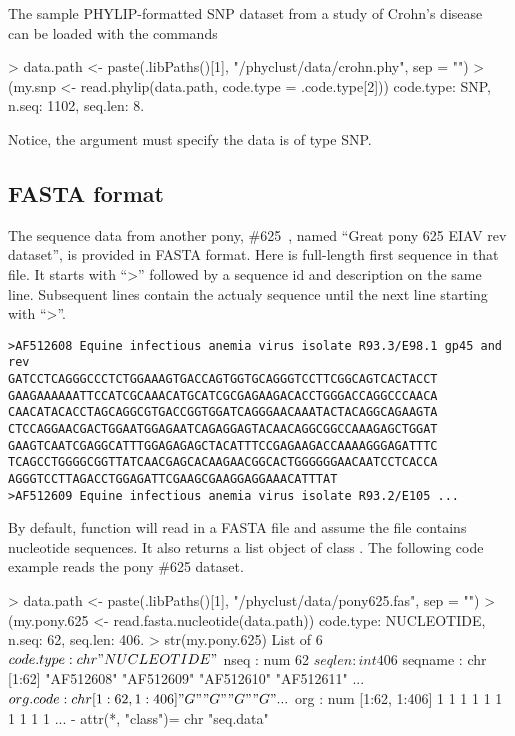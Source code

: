The sample PHYLIP-formatted SNP dataset from a study of Crohn's disease~\citep{Hugot2001} can be loaded with the commands
\begin{Code}
> data.path <- paste(.libPaths()[1], "/phyclust/data/crohn.phy", sep = "")
> (my.snp <- read.phylip(data.path, code.type = .code.type[2]))
code.type: SNP, n.seq: 1102, seq.len: 8.
\end{Code}
Notice, the  argument must specify the data is of type SNP.




\subsection[Input FASTA format]{FASTA format}
\label{sec:fasta}

The sequence data from another pony, \#625~\citep{Baccam2003},
named ``Great pony 625 EIAV rev dataset'',
is provided in FASTA format.
Here is full-length first sequence in that file. It starts with ``>''
followed by a sequence id and description on the same line.
Subsequent lines contain the actualy sequence until the next line starting with ``>''.
\begin{verbatim}
>AF512608 Equine infectious anemia virus isolate R93.3/E98.1 gp45 and rev
GATCCTCAGGGCCCTCTGGAAAGTGACCAGTGGTGCAGGGTCCTTCGGCAGTCACTACCT
GAAGAAAAAATTCCATCGCAAACATGCATCGCGAGAAGACACCTGGGACCAGGCCCAACA
CAACATACACCTAGCAGGCGTGACCGGTGGATCAGGGAACAAATACTACAGGCAGAAGTA
CTCCAGGAACGACTGGAATGGAGAATCAGAGGAGTACAACAGGCGGCCAAAGAGCTGGAT
GAAGTCAATCGAGGCATTTGGAGAGAGCTACATTTCCGAGAAGACCAAAAGGGAGATTTC
TCAGCCTGGGGCGGTTATCAACGAGCACAAGAACGGCACTGGGGGGAACAATCCTCACCA
AGGGTCCTTAGACCTGGAGATTCGAAGCGAAGGAGGAAACATTTAT
>AF512609 Equine infectious anemia virus isolate R93.2/E105 ...
\end{verbatim}

By default, function  will read in a FASTA file and
assume the file contains nucleotide sequences. 
It also returns a list object of class .
The following code example reads the pony \#625 dataset.
\begin{Code}
> data.path <- paste(.libPaths()[1], "/phyclust/data/pony625.fas", sep = "")
> (my.pony.625 <- read.fasta.nucleotide(data.path))
code.type: NUCLEOTIDE, n.seq: 62, seq.len: 406.
> str(my.pony.625)
List of 6
 $ code.type: chr "NUCLEOTIDE"
 $ nseq     : num 62
 $ seqlen   : int 406
 $ seqname  : chr [1:62] "AF512608" "AF512609" "AF512610" "AF512611" ...
 $ org.code : chr [1:62, 1:406] "G" "G" "G" "G" ...
 $ org      : num [1:62, 1:406] 1 1 1 1 1 1 1 1 1 1 ...
 - attr(*, "class")= chr "seq.data"
\end{Code}




